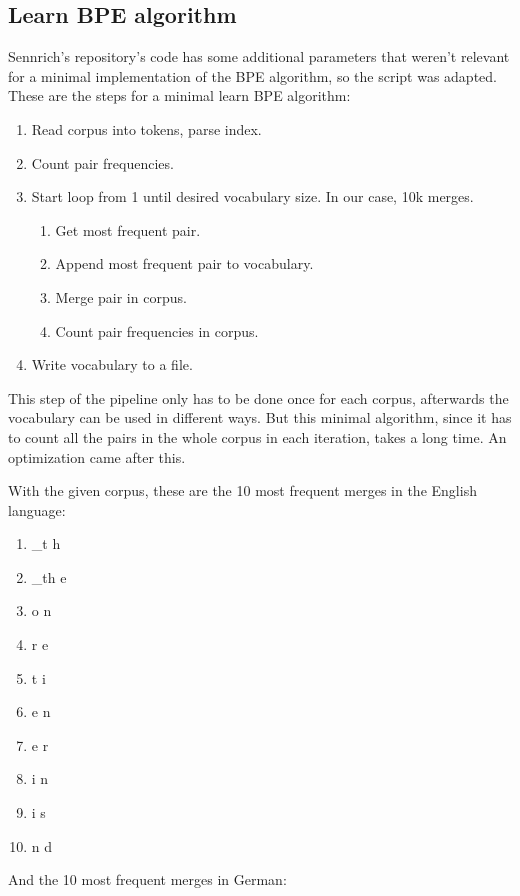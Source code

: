 \subsection{Learn BPE algorithm}

Sennrich's repository's code has some additional parameters that weren't relevant for a minimal implementation of the BPE algorithm, so the script was adapted. These are the steps for a minimal learn BPE algorithm:

\begin{enumerate}
	\item Read corpus into tokens, parse index.
	\item Count pair frequencies.
	\item Start loop from 1 until desired vocabulary size. In our case, 10k merges.
	\begin{enumerate}
		\item Get most frequent pair.
		\item Append most frequent pair to vocabulary.
		\item Merge pair in corpus.
		\item Count pair frequencies in corpus.
	\end{enumerate}
	\item Write vocabulary to a file.
\end{enumerate}

This step of the pipeline only has to be done once for each corpus, afterwards the vocabulary can be used in different ways. But this minimal algorithm, since it has to count all the pairs in the whole corpus in each iteration, takes a long time. An optimization came after this.

With the given corpus, these are the 10 most frequent merges in the English language:

\begin{enumerate}
	\item \_t h
	\item \_th e
	\item o n
	\item r e
	\item t i
	\item e n
	\item e r
	\item i n
	\item i s
	\item n d
\end{enumerate}

And the 10 most frequent merges in German:

